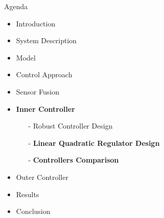
\begin{frame}{Agenda}{}
    \begin{itemize}
        \item Introduction
        \item System Description
        \item Model
        \item Control Approach
        \item Sensor Fusion
        \item \textcolor{aaublue}{\textbf{Inner Controller}}
        \begin{itemize}
            \item[-] Robust Controller Design
            \item[-] \textcolor{aaublue}{\textbf{Linear Quadratic Regulator Design}}
            \item[-] \textcolor{aaublue}{\textbf{Controllers Comparison}}
        \end{itemize}
        \item Outer Controller
        \item Results
        \item Conclusion
    \end{itemize}
\end{frame}
